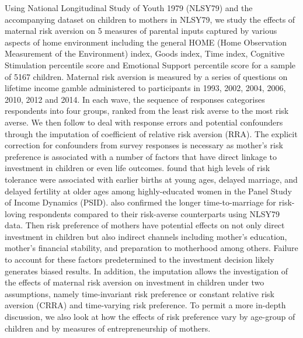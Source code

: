 \documentclass[emulatestandardclasses, 10pt, abstract = true]{scrartcl}
\begin{document}
Using National Longitudinal Study of Youth 1979 (NLSY79) and the accompanying dataset on children to mothers in NLSY79, we study the effects of maternal risk aversion on 5 measures of parental inputs captured by various aspects of home environment including the general HOME (Home Observation Measurement of the Environment) index, Goods index, Time index, Cognitive Stimulation percentile score and Emotional Support percentile score for a sample of 5167 children. Maternal risk aversion is measured by a series of questions on lifetime income gamble administered to participants in 1993, 2002, 2004, 2006, 2010, 2012 and 2014. In each wave, the sequence of responses categorises respondents into four groups, ranked from the least risk averse to the most risk averse. We then follow \citet{kimball2008imputing, kimball2009risk} to deal with response errors and potential confounders through the imputation of coefficient of relative risk aversion (RRA). The explicit correction for confounders from survey responses is necessary as mother's risk preference is associated with a number of factors that have direct linkage to investment in children or even life outcomes. \citet{schmidt2008risk} found that high levels of risk tolerance were associated with earlier births at young ages, delayed marriage, and delayed fertility at older ages among highly-educated women in the Panel Study of Income Dynamics (PSID). \citet{spivey2010desperation} also confirmed the longer time-to-marriage for risk-loving respondents compared to their risk-averse counterparts using NLSY79 data. Then risk preference of mothers have potential effects on not only direct investment in children but also indirect channels including mother's education, mother's financial stability, and preparation to motherhood among others. Failure to account for these factors predetermined to the investment decision likely generates biased results. In addition, the imputation allows the investigation of the effects of maternal risk aversion on investment in children under two assumptions, namely time-invariant risk preference or constant relative risk aversion (CRRA) and time-varying risk preference. To permit a more in-depth discussion, we also look at how the effects of risk preference vary by age-group of children and by measures of entrepreneurship of mothers.
 
\end{document}
